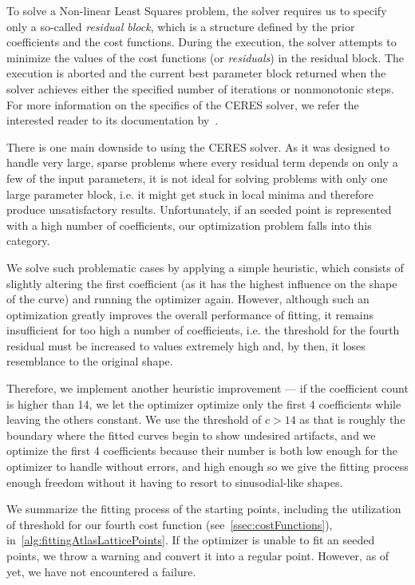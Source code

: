To solve a Non-linear Least Squares problem, the solver requires us to specify only a so-called \emph{residual block}, which is a structure defined by the prior coefficients and the cost functions. During the execution, the solver attempts to minimize the values of the cost functions (or \emph{residuals}) in the residual block. The execution is aborted and the current best parameter block returned when the solver achieves either the specified number of iterations or nonmonotonic steps. For more information on the specifics of the CERES solver, we refer the interested reader to its documentation by~\citet{ceresNonLinearLeastSquares}.

There is one main downside to using the CERES solver. As it was designed to handle very large, sparse problems where every residual term depends on only a few of the input parameters, it is not ideal for solving problems with only one large parameter block, i.e. it might get stuck in local minima and therefore produce unsatisfactory results. Unfortunately, if an seeded point is represented with a high number of coefficients, our optimization problem falls into this category.

We solve such problematic cases by applying a simple heuristic, which consists of slightly altering the first coefficient (as it has the highest influence on the shape of the curve) and running the optimizer again. However, although such an optimization greatly improves the overall performance of fitting, it remains insufficient for too high a number of coefficients, i.e. the threshold for the fourth residual must be increased to values extremely high and, by then, it loses resemblance to the original shape.

Therefore, we implement another heuristic improvement --- if the coefficient count is higher than 14, we let the optimizer optimize only the first 4 coefficients while leaving the others constant. We use the threshold of $c > 14$ as that is roughly the boundary where the fitted curves begin to show undesired artifacts, and we optimize the first 4 coefficients because their number is both low enough for the optimizer to handle without errors, and high enough so we give the fitting process enough freedom without it having to resort to sinusodial-like shapes.

We summarize the fitting process of the starting points, including the utilization of threshold for our fourth cost function (see~\cref{ssec:costFunctions}), in~\cref{alg:fittingAtlasLatticePoints}. If the optimizer is unable to fit an seeded points, we throw a warning and convert it into a regular point. However, as of yet, we have not encountered a failure.

